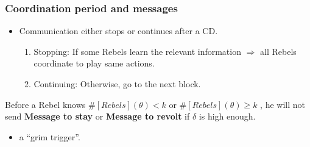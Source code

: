 \documentclass[9pt]{beamer}
\begin{document}
\begin{frame}[label=protocol_grim_trigger]
\frametitle{Coordination period and messages}



\begin{itemize}
\item Communication either stops or continues after a CD.
\begin{enumerate}
\item {Stopping}: If some Rebels learn the relevant information $\Rightarrow$ all Rebels coordinate to play same actions. 
\item {Continuing}: Otherwise, go to the next block.
\end{enumerate}

\end{itemize}

\pause
\begin{lemma}
Before a Rebel knows $\#[Rebels](\theta)< k$ or $\#[Rebels](\theta)\geq k$ , he will not send \textbf{Message to stay} or \textbf{Message to revolt} if $\delta$ is high enough.
\end{lemma}
\begin{itemize}
\item a ``grim trigger''.
\end{itemize}
\hyperlink{CD_to_RP}{}
\end{frame}
\end{document}
